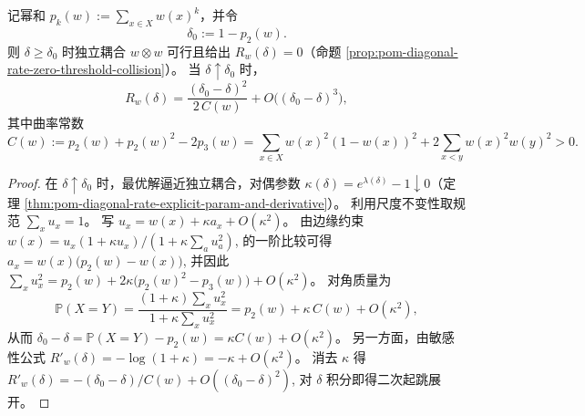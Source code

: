 \begin{theorem}\label{thm:pom-diagonal-rate-zero-rate-endpoint-quadratic-curvature}
记幂和 \(p_k(w):=\sum_{x\in X}w(x)^k\)，并令
\[
\delta_0:=1-p_2(w).
\]
则 \(\delta\ge\delta_0\) 时独立耦合 \(w\otimes w\) 可行且给出 \(R_w(\delta)=0\)（命题 \ref{prop:pom-diagonal-rate-zero-threshold-collision}）。
当 \(\delta\uparrow\delta_0\) 时，
\[
R_w(\delta)=\frac{(\delta_0-\delta)^2}{2\,C(w)}+O\bigl((\delta_0-\delta)^3\bigr),
\]
其中曲率常数
\[
C(w):=p_2(w)+p_2(w)^2-2p_3(w)
=\sum_{x\in X}w(x)^2(1-w(x))^2+2\sum_{x<y}w(x)^2w(y)^2>0.
\]
\end{theorem}
\begin{proof}
在 \(\delta\uparrow\delta_0\) 时，最优解逼近独立耦合，对偶参数 \(\kappa(\delta)=e^{\lambda(\delta)}-1\downarrow 0\)（定理 \ref{thm:pom-diagonal-rate-explicit-param-and-derivative}）。
利用尺度不变性取规范 \(\sum_x u_x=1\)。
写
\(
u_x=w(x)+\kappa a_x+O(\kappa^2)
\)。
由边缘约束
\(
w(x)=u_x(1+\kappa u_x)/(1+\kappa\sum_a u_a^2)
\),
的一阶比较可得
\(
a_x=w(x)\bigl(p_2(w)-w(x)\bigr)
\),
并因此
\(
\sum_x u_x^2=p_2(w)+2\kappa\bigl(p_2(w)^2-p_3(w)\bigr)+O(\kappa^2)
\)。
对角质量为
\[
\mathbb P(X=Y)=\frac{(1+\kappa)\sum_x u_x^2}{1+\kappa\sum_x u_x^2}
=p_2(w)+\kappa\,C(w)+O(\kappa^2),
\]
从而
\(
\delta_0-\delta=\mathbb P(X=Y)-p_2(w)=\kappa C(w)+O(\kappa^2)
\)。
另一方面，由敏感性公式
\(
R'_w(\delta)=-\log(1+\kappa)=-\kappa+O(\kappa^2)
\)。
消去 \(\kappa\) 得
\(
R'_w(\delta)=-(\delta_0-\delta)/C(w)+O((\delta_0-\delta)^2)
\),
对 \(\delta\) 积分即得二次起跳展开。
\end{proof}


